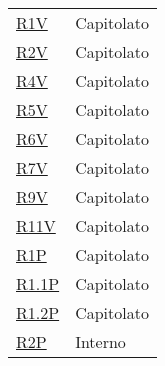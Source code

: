 \begin{center}
\begin{longtable}[!h]{p{50px} p{50px}}
        \hyperref[tab:RequisitiVincolo]{R1V}         & Capitolato                    \\
        \hyperref[tab:RequisitiVincolo]{R2V}         & Capitolato                    \\
        \hyperref[tab:RequisitiVincolo]{R4V}         & Capitolato                    \\
        \hyperref[tab:RequisitiVincolo]{R5V}         & Capitolato                    \\
        \hyperref[tab:RequisitiVincolo]{R6V}         & Capitolato                    \\
        \hyperref[tab:RequisitiVincolo]{R7V}         & Capitolato                    \\
        \hyperref[tab:RequisitiVincolo]{R9V}         & Capitolato                    \\
        \hyperref[tab:RequisitiVincolo]{R11V}        & Capitolato                    \\

        \hyperref[tab:RequisitiPrestazionali]{R1P}   & Capitolato                    \\
        \hyperref[tab:RequisitiPrestazionali]{R1.1P} & Capitolato                    \\
        \hyperref[tab:RequisitiPrestazionali]{R1.2P} & Capitolato                    \\
        \hyperref[tab:RequisitiPrestazionali]{R2P}   & Interno                       \\
    \end{longtable}
\end{center}